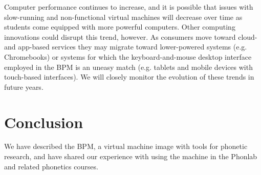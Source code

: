 \documentclass[a4paper]{article}
\begin{document}
    Computer performance continues to increase, and it is possible that issues with slow-running and non-functional virtual machines will decrease over time as students come equipped with more powerful computers. Other computing innovations could disrupt this trend, however. As consumers move toward cloud- and app-based services they may migrate toward lower-powered systems (e.g. Chromebooks) or systems for which the keyboard-and-mouse desktop interface employed in the BPM is an uneasy match (e.g. tablets and mobile devices with touch-based interfaces). We will closely monitor the evolution of these trends in future years.

  \section{Conclusion}
  We have described the BPM, a virtual machine image with tools for phonetic research, and have shared our experience with using the machine in the Phonlab and related phonetics courses.

  \newpage
  \eightpt
  

  

\end{document}
